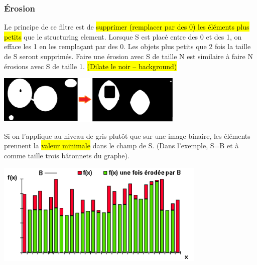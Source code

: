 \documentclass[letterpaper, 12pt]{article}
\newcommand{\alinea}{
\hspace*{0.5cm}}
\begin{document}
		\subsubsection{\'Erosion}
			\alinea Le principe de ce filtre est de \hl{supprimer (remplacer par des 0) les éléments plus petits} que le 
				structuring element.
				Lorsque S est placé  entre des 0 et des 1, on efface les 1 en les remplaçant par des 0. Les objets plus petits que 
				2 fois la taille de S seront supprimés. Faire une érosion avec S de taille N est similaire à faire N érosions
				avec S de taille 1. \hl{(Dilate le noir -- background)}
			\begin{center}
				\includegraphics[width=3.5in]{Images/erosion}
			\end{center}
			\begin{minipage}{0.33\textwidth}
				\alinea Si on l'applique au niveau de gris plutôt que sur une image binaire, les éléments prennent la \hl{valeur minimale}
					dans le champ de S. (Dans l'exemple, S=B et à comme taille trois bâtonnets du graphe).
			\end{minipage} \hfill
			\begin{minipage}{0.66\textwidth}
				\begin{center}
					\includegraphics[width=3.95in]{Images/erosion2}
				\end{center}
			\end{minipage}
\end{document}
